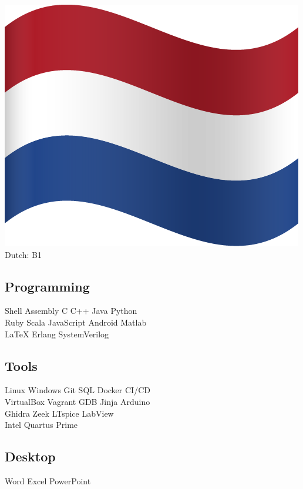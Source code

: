 \documentclass[]{deedy-resume-openfont}
\begin{document}
\begin{minipage}[t]{0.35\textwidth}
\includegraphics[scale=0.015]{images/netherlands.png}  Dutch: B1

\vspace{5pt}

\subsection{Programming}
Shell \textbullet{} Assembly \textbullet{} C \textbullet{} C++ \textbullet{} Java \textbullet{} Python \\
Ruby \textbullet{} Scala \textbullet{} JavaScript \textbullet{} Android \textbullet{} Matlab \\
\LaTeX \textbullet{} Erlang \textbullet{} SystemVerilog

\vspace{5pt}

\subsection{Tools}
Linux \textbullet{} Windows \textbullet{} Git \textbullet{} SQL \textbullet{} Docker \textbullet{} CI/CD \\
VirtualBox \textbullet{} Vagrant \textbullet{} GDB \textbullet{} Jinja \textbullet{} Arduino \\
Ghidra \textbullet{} Zeek \textbullet{} LTspice \textbullet{} LabView \\
Intel Quartus Prime

\vspace{5pt}

\subsection{Desktop}
Word \textbullet{} Excel \textbullet{} PowerPoint




\end{minipage}
\end{document}
